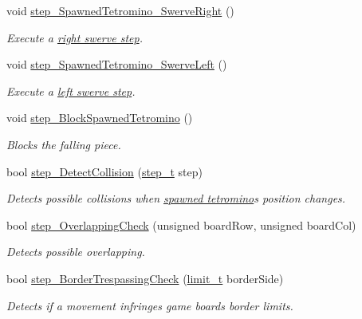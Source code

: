 \begin{DoxyCompactItemize}
void \hyperlink{classTetreesEngine_a46e1950877c8b8aa7e988ca3de14ad18}{step\+\_\+\+Spawned\+Tetromino\+\_\+\+Swerve\+Right} ()
\begin{DoxyCompactList}\small\item\em Execute a \hyperlink{TetreesDefs_8hpp_a4d5a793092a473f85b4c1f7faf62afeda86fdea6e730f10b7d265b067552624d3}{right swerve step}. \end{DoxyCompactList}\item 
void \hyperlink{classTetreesEngine_ab7169a28a06a867ada69a01a580fb2ad}{step\+\_\+\+Spawned\+Tetromino\+\_\+\+Swerve\+Left} ()
\begin{DoxyCompactList}\small\item\em Execute a \hyperlink{TetreesDefs_8hpp_a4d5a793092a473f85b4c1f7faf62afeda3b27946656fc3bf9470a8b7761cfa8e1}{left swerve step}. \end{DoxyCompactList}\item 
void \hyperlink{classTetreesEngine_a0978ef1f287f00a8ed5a4af2d680b943}{step\+\_\+\+Block\+Spawned\+Tetromino} ()
\begin{DoxyCompactList}\small\item\em Blocks the falling piece. \end{DoxyCompactList}\item 
bool \hyperlink{classTetreesEngine_a25f8b896240ce2d2a34b1d968e75b5b6}{step\+\_\+\+Detect\+Collision} (\hyperlink{TetreesDefs_8hpp_a4d5a793092a473f85b4c1f7faf62afed}{step\+\_\+t} step)
\begin{DoxyCompactList}\small\item\em Detects possible collisions when \hyperlink{classTetreesEngine_a26435ee2f02d9ba70d9e359745114f6e}{spawned tetromino}\textquotesingle{}s position changes. \end{DoxyCompactList}\item 
bool \hyperlink{classTetreesEngine_a270b227c9dfbfb72513c6cdfdd910d1b}{step\+\_\+\+Overlapping\+Check} (unsigned board\+Row, unsigned board\+Col)
\begin{DoxyCompactList}\small\item\em Detects possible overlapping. \end{DoxyCompactList}\item 
bool \hyperlink{classTetreesEngine_aa593f5f688e984a2cdbbf83b162d00a2}{step\+\_\+\+Border\+Trespassing\+Check} (\hyperlink{TetreesDefs_8hpp_a5dbb1ebfe8a9b95707ac161d3549ed8a}{limit\+\_\+t} border\+Side)
\begin{DoxyCompactList}\small\item\em Detects if a movement infringes game board\textquotesingle{}s border limits. \end{DoxyCompactList}\item 

\end{DoxyCompactItemize}
